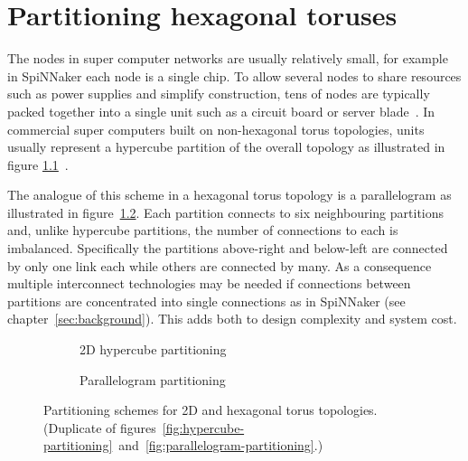 \chapter{Partitioning hexagonal toruses}
	
	\label{sec:partitioning}
	
	The nodes in super computer networks are usually relatively small, for
	example in SpiNNaker each node is a single chip. To allow several nodes to
	share resources such as power supplies and simplify construction, tens of
	nodes are typically packed together into a single unit such as a circuit
	board or server blade~\cite{gilge14,ajima12}. In commercial super computers
	built on non-hexagonal torus topologies, units usually represent a hypercube
	partition of the overall topology as illustrated in figure
	\ref{fig:apdx-hypercube-partitioning}~\cite{chen11,ajima12}.
	
	
	The analogue of this scheme in a hexagonal torus topology is a parallelogram
	as illustrated in figure~\ref{fig:apdx-parallelogram-partitioning}.  Each
	partition connects to six neighbouring partitions and, unlike hypercube
	partitions, the number of connections to each is imbalanced.  Specifically
	the partitions above-right and below-left are connected by only one link each
	while others are connected by many. As a consequence multiple interconnect
	technologies may be needed if connections between partitions are concentrated
	into single connections as in SpiNNaker (see chapter~\ref{sec:background}).
	This adds both to design complexity and system cost.
	
	\begin{figure}
		\center
		\begin{subfigure}[b]{0.45\textwidth}
			\center
			\caption{2D hypercube partitioning}
			\label{fig:apdx-hypercube-partitioning}
		\end{subfigure}
		\begin{subfigure}[b]{0.45\textwidth}
			\center
			\caption{Parallelogram partitioning}
			\label{fig:apdx-parallelogram-partitioning}
		\end{subfigure}
		
		\caption[Partitioning schemes for 2D and hexagonal torus topologies.]%
		{Partitioning schemes for 2D and hexagonal torus topologies. (Duplicate of
		figures~\ref{fig:hypercube-partitioning}~and~\ref{fig:parallelogram-partitioning}.)}
		
		\label{fig:apdx-partitioning-options}
	\end{figure}
	
